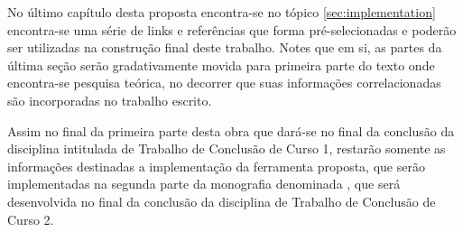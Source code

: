     No último capítulo desta proposta encontra-se no tópico \autoref{sec:implementation} encontra-se
    uma série de links e referências que forma pré-selecionadas e poderão ser utilizadas na
    construção final deste trabalho. Notes que em si, as partes da última seção serão gradativamente
    movida para primeira parte do texto onde encontra-se pesquisa teórica, no decorrer que suas
    informações correlacionadas são incorporadas no trabalho escrito.

    Assim no final da primeira parte desta obra que dará-se no final da conclusão da disciplina
    intitulada de Trabalho de Conclusão de Curso 1, restarão somente as informações destinadas a
    implementação da ferramenta proposta, que serão implementadas na segunda parte da monografia
    denominada , que será desenvolvida no final da conclusão da
    disciplina de Trabalho de Conclusão de Curso 2.










